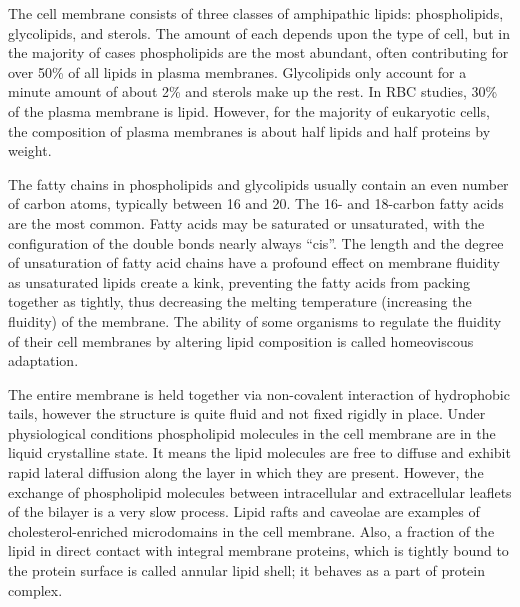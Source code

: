 \documentclass[
]{book}
\begin{document}
The cell membrane consists of three classes of amphipathic lipids: phospholipids, glycolipids, and sterols. The amount of each depends upon the type of cell, but in the majority of cases phospholipids are the most abundant, often contributing for over 50\% of all lipids in plasma membranes. Glycolipids only account for a minute amount of about 2\% and sterols make up the rest. In RBC studies, 30\% of the plasma membrane is lipid. However, for the majority of eukaryotic cells, the composition of plasma membranes is about half lipids and half proteins by weight.

The fatty chains in phospholipids and glycolipids usually contain an even number of carbon atoms, typically between 16 and 20. The 16- and 18-carbon fatty acids are the most common. Fatty acids may be saturated or unsaturated, with the configuration of the double bonds nearly always ``cis''. The length and the degree of unsaturation of fatty acid chains have a profound effect on membrane fluidity as unsaturated lipids create a kink, preventing the fatty acids from packing together as tightly, thus decreasing the melting temperature (increasing the fluidity) of the membrane. The ability of some organisms to regulate the fluidity of their cell membranes by altering lipid composition is called homeoviscous adaptation.

The entire membrane is held together via non-covalent interaction of hydrophobic tails, however the structure is quite fluid and not fixed rigidly in place. Under physiological conditions phospholipid molecules in the cell membrane are in the liquid crystalline state. It means the lipid molecules are free to diffuse and exhibit rapid lateral diffusion along the layer in which they are present. However, the exchange of phospholipid molecules between intracellular and extracellular leaflets of the bilayer is a very slow process. Lipid rafts and caveolae are examples of cholesterol-enriched microdomains in the cell membrane. Also, a fraction of the lipid in direct contact with integral membrane proteins, which is tightly bound to the protein surface is called annular lipid shell; it behaves as a part of protein complex.
\end{document}
